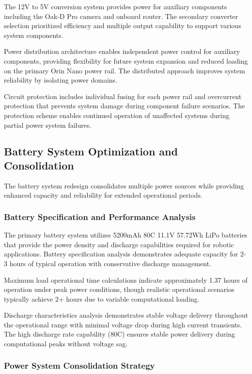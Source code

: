The 12V to 5V conversion system provides power for auxiliary components including the Oak-D Pro camera and onboard router. The secondary converter selection prioritized efficiency and multiple output capability to support various system components.

Power distribution architecture enables independent power control for auxiliary components, providing flexibility for future system expansion and reduced loading on the primary Orin Nano power rail. The distributed approach improves system reliability by isolating power domains.

Circuit protection includes individual fusing for each power rail and overcurrent protection that prevents system damage during component failure scenarios. The protection scheme enables continued operation of unaffected systems during partial power system failures.

\subsection{Battery System Optimization and Consolidation}

The battery system redesign consolidates multiple power sources while providing enhanced capacity and reliability for extended operational periods.

\subsubsection{Battery Specification and Performance Analysis}

The primary battery system utilizes 5200mAh 80C 11.1V 57.72Wh LiPo batteries that provide the power density and discharge capabilities required for robotic applications. Battery specification analysis demonstrates adequate capacity for 2-3 hours of typical operation with conservative discharge management.

Maximum load operational time calculations indicate approximately 1.37 hours of operation under peak power conditions, though realistic operational scenarios typically achieve 2+ hours due to variable computational loading.

Discharge characteristics analysis demonstrates stable voltage delivery throughout the operational range with minimal voltage drop during high current transients. The high discharge rate capability (80C) ensures stable power delivery during computational peaks without voltage sag.

\subsubsection{Power System Consolidation Strategy}

